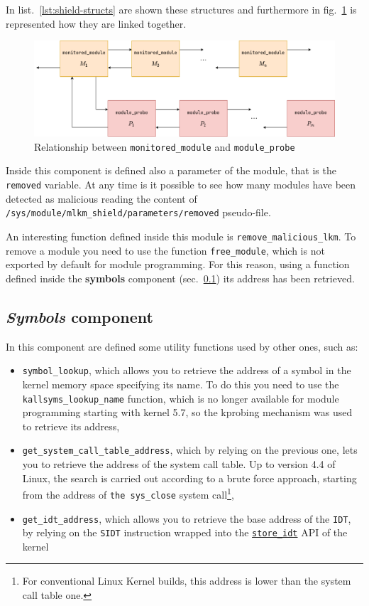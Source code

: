 \documentclass{article}
\begin{document}
	In list.~\ref{lst:shield-structs} are shown these structures and furthermore in fig.~\ref{fig:shield-structs} is
	represented how they are linked together.

	\begin{figure}[!htbp]
		\centering
		\includegraphics[scale=0.4]{shield-structs}
		\caption{Relationship between \texttt{monitored\_module} and \texttt{module\_probe}}
		\label{fig:shield-structs}
	\end{figure}

	Inside this component is defined also a parameter of the module, that is the \texttt{removed} variable. At any time
	is it possible to see how many modules have been detected as malicious reading the content of
	\texttt{/sys/module/mlkm\_shield/parameters/removed} pseudo-file.

	An interesting function defined inside this module is \texttt{remove\_malicious\_lkm}. To remove a module you need
	to use the function \texttt{free\_module}, which is not exported by default for module programming. For this
	reason, using a function defined inside the \textbf{symbols} component (sec.~\ref{sec:symbols}) its address has
	been retrieved.

	\subsection{\textsl{Symbols} component}\label{sec:symbols}
	In this component are defined some utility functions used by other ones, such as:
	\begin{itemize}
		\item \texttt{symbol\_lookup}, which allows you to retrieve the address of a symbol in the kernel memory space
		specifying its name. To do this you need to use the \texttt{kallsyms\_lookup\_name} function, which is no
		longer available for module programming starting with kernel 5.7, so the kprobing mechanism was used to
		retrieve its address,
		\item \texttt{get\_system\_call\_table\_address}, which by relying on the previous one, lets you to retrieve
		the address of the system call table. Up to version 4.4 of Linux, the search is carried out according to a
		brute force approach, starting from the address of \texttt{the sys\_close} system call\footnote{For
			conventional Linux Kernel builds, this address is lower than the system call table one.},
		\item \texttt{get\_idt\_address}, which allows you to retrieve the base address of the \texttt{IDT}, by relying
		on the \texttt{SIDT} instruction wrapped into the
		\href{https://elixir.bootlin.com/linux/latest/source/arch/x86/include/asm/desc.h#L223}{\texttt{store\_idt}} API
		of the kernel
	\end{itemize}
\end{document}
